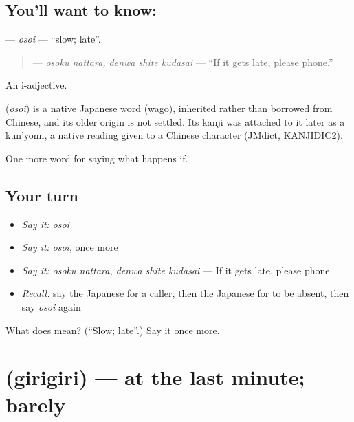\subsection*{You'll want to know: }
\textbf{} — \emph{osoi} — \textquotedblleft{}slow; late\textquotedblright{}.

\begin{quote}
\textbf{  } — \emph{osoku nattara, denwa shite kudasai} — \textquotedblleft{}If it gets late, please phone.\textquotedblright{}
\end{quote}

An i-adjective.

\begin{cousinweb}
\textbf{} (\emph{osoi}) is a native Japanese word (wago), inherited rather than borrowed from Chinese, and its older origin is not settled. Its kanji was attached to it later as a kun'yomi, a native reading given to a Chinese character (JMdict, KANJIDIC2).
\end{cousinweb}

\begin{grammarlens}[title={What you've built}]
One more word for saying what happens if.
\end{grammarlens}

\subsection*{Your turn}
\begin{itemize}
\raggedright
  \item \emph{Say it:} \emph{osoi}
  \item \emph{Say it:} \emph{osoi}, once more
  \item \emph{Say it:} \emph{osoku nattara, denwa shite kudasai} — If it gets late, please phone.
  \item \emph{Recall:} say the Japanese for a caller, then the Japanese for to be absent, then say \emph{osoi} again
\end{itemize}

\begin{tcolorbox}[breakable,colback=teal!4,colframe=teal!35!black,title={Before you move on}]
What does  mean? (\textquotedblleft{}Slow; late\textquotedblright{}.) Say it once more.
\end{tcolorbox}
\section[\texorpdfstring{\ja{ぎりぎり} (girigiri)}{ぎりぎり (girigiri)}]{ (girigiri) — at the last minute; barely}

